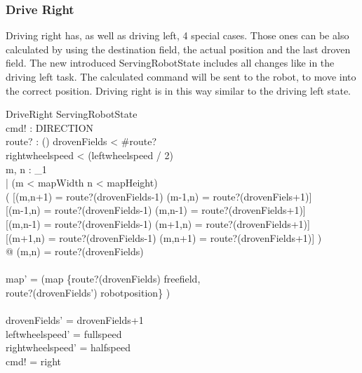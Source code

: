 \documentclass[11pt,a4paper]{article}
\begin{document}
\subsubsection{Drive Right}
Driving right has, as well as driving left, 4 special cases. Those ones can be also calculated by using the destination field, the actual position and the last droven field. The new introduced ServingRobotState includes all changes like in the driving left task. The calculated command will be sent to the robot, to move into the correct position. Driving right is in this way similar to the driving left state.
\begin{schema}{DriveRight}
\Delta ServingRobotState\\
cmd! : DIRECTION\\
route? : \iseq (\nat \cross \nat)
\where
drovenFields < \#route?\\
rightwheelspeed < (leftwheelspeed / 2)\\
\forall m, n : \nat_1 \\
\hspace{20pt} | (m < mapWidth \land n < mapHeight) \land  \\
\hspace{30pt} ( [(m,n+1) = route?(drovenFields-1) \land (m-1,n) = route?(drovenFiels+1)] \lor \\
\hspace{30pt}   [(m-1,n) = route?(drovenFields-1) \land (m,n-1) = route?(drovenFields+1)] \lor \\
\hspace{30pt}   [(m,n-1) = route?(drovenFields-1) \land (m+1,n) = route?(drovenFields+1)] \lor \\
\hspace{30pt}   [(m+1,n) = route?(drovenFields-1) \land (m,n+1) = route?(drovenFields+1)] )\\
\hspace{20pt}@ (m,n) = route?(drovenFields)\\
\\
map' = (map \oplus \{route?(drovenFields) \mapsto freefield,\\ 
\hspace{85pt} route?(drovenFields') \mapsto robotposition\} ) \\\\

drovenFields' = drovenFields+1\\
leftwheelspeed' = fullspeed\\
rightwheelspeed' = halfspeed\\
cmd! = right
\end{schema}
\end{document}

